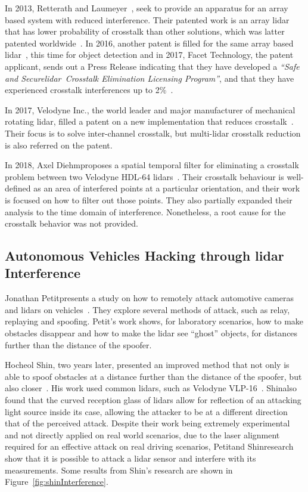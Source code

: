 In 2013, Retterath and Laumeyer~\cite{Retterath2015}, seek to provide an apparatus for an array based system with reduced interference. Their patented work is an array \ac{lidar} that has lower probability of crosstalk than other solutions, which was latter patented worldwide~\cite{Retterath2015WO}. In 2016, another patent is filled for the same array based \ac{lidar}~\cite{Retterath2016}, this time for object detection and in 2017, Facet Technology, the patent applicant, sends out a Press Release indicating that they have developed a \textit{``Safe and Secure\acs{lidar}\cp~Crosstalk Elimination Licensing Program''}, and that they have experienced crosstalk interferences up to 2\%~\cite{Facet}.

In 2017, Velodyne Inc., the world leader and  major manufacturer of mechanical rotating \ac{lidar}, filled a patent on a new implementation that reduces crosstalk~\cite{Hall2017}. Their focus is to solve inter-channel crosstalk, but multi-\ac{lidar} crosstalk reduction is also referred on the patent.

In 2018, Axel Diehm\etal proposes a spatial temporal filter for eliminating a crosstalk problem between two Velodyne HDL-64 \acp{lidar}~\cite{Hebel2018}. Their crosstalk behaviour is well-defined as an area of interfered points at a particular orientation, and their work is focused on how to filter out those points. They also partially expanded their analysis to the time domain of interference. Nonetheless, a root cause for the crosstalk behavior was not provided.

\subsection{Autonomous Vehicles Hacking through \acs{lidar} Interference}
Jonathan Petit\etal presents a study on how to remotely attack automotive cameras and \acp{lidar} on vehicles~\cite{Petit2015}. They explore several methods of attack, such as relay, replaying and spoofing. Petit's work shows, for laboratory scenarios, how to make obstacles disappear and how to make the \ac{lidar} see ``ghost'' objects, for distances further than the distance of the spoofer. 

Hocheol Shin\etal, two years later, presented an improved method that not only is able to spoof obstacles at a distance further than the distance of the spoofer, but also closer~\cite{Shin2017}. His work used common \acp{lidar}, such as Velodyne VLP-16~\cite{VLP16}. Shin\etal also found that the curved reception glass of \acp{lidar} allow for reflection of an attacking light source inside its case, allowing the attacker to be at a different direction that of the perceived attack. Despite their work being extremely experimental and not directly applied on real world scenarios, due to the laser alignment required for an effective attack on real driving scenarios, Petit\etal and Shin\etal research show that it is possible to attack a \ac{lidar} sensor and interfere with its measurements. Some results from Shin's research are shown in Figure~\ref{fig:shinInterference}.

